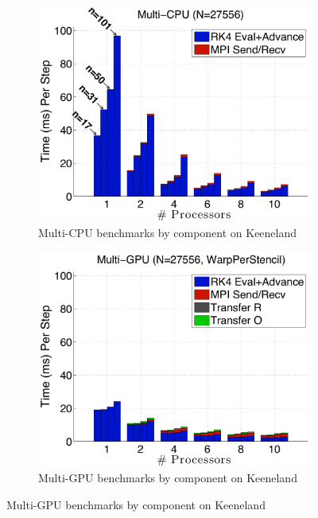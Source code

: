 \begin{figure}
\centering
\begin{subfigure}[t]{0.425\textwidth}
\centering
\includegraphics[width=1.0\textwidth]{../figures/keeneland_results/alltoallv/multiCPU_costs.pdf}
\caption{Multi-CPU benchmarks by component on Keeneland}
\label{fig:alltoall_multicpu_costs}
\end{subfigure} 
\begin{subfigure}[t]{0.425\textwidth}
\centering
\includegraphics[width=1.0\textwidth]{../figures/keeneland_results/alltoallv/multiGPU_warp_costs.pdf}
\caption{Multi-GPU benchmarks by component on Keeneland}
\label{fig:alltoall_multigpu_costs}
\end{subfigure} 
\end{figure} 

